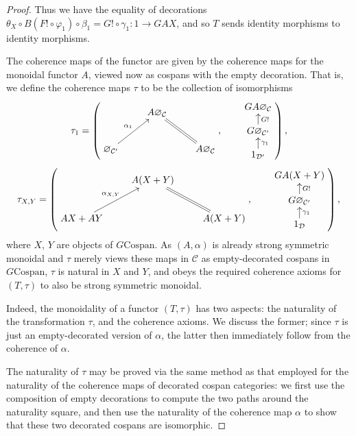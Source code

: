 \begin{proof}
Thus
we have the equality of decorations $\theta_X \circ B(F! \circ \varphi_1) \circ
\beta_1
= G! \circ \gamma_1\colon  1 \to GAX$, and so $T$ sends identity morphisms to
identity morphisms.

  The coherence maps of the functor are given by the coherence maps for the
  monoidal functor $A$, viewed now as cospans with the empty decoration. That
  is, we define the coherence maps $\tau$ to be the collection of isomorphisms
  \[
    \tau_1 = 
    \left(
    \begin{aligned}
      \xymatrix{
	& A\varnothing_{\mathcal C} \\  
	\varnothing_{\mathcal C'} \ar[ur]^{\alpha_1} && A\varnothing_{\mathcal
	C} \ar@{=}[ul]
      }
    \end{aligned}
    ,
    \qquad
    \begin{aligned}
      \xymatrixrowsep{.9pc}
      \xymatrix{
	GA\varnothing_{\mathcal C} \\
	G\varnothing_{\mathcal C'} \ar[u]_{G!} \\
	1_{\mathcal D'} \ar[u]_{\gamma_1}
      }
    \end{aligned}
    \right),
  \]
  \[
    \tau_{X,Y}=
    \left(
    \begin{aligned}
      \xymatrix{
	& A(X+Y) \\  
	AX+AY \ar[ur]^{\alpha_{X,Y}} && A(X+Y) \ar@{=}[ul]
      }
    \end{aligned}
    ,
    \qquad
    \begin{aligned}
      \xymatrixrowsep{.9pc}
      \xymatrix{
	GA(X+Y) \\
	G\varnothing_{\mathcal C'} \ar[u]_{G!} \\
	1_{\mathcal D} \ar[u]_{\gamma_1}
      }
    \end{aligned}
    \right),
  \]
  where $X$, $Y$ are objects of $G\mathrm{Cospan}$. As $(A,\alpha)$ is already
  strong symmetric monoidal and $\tau$ merely views these maps in $\mathcal C$
  as empty-decorated cospans in $G\mathrm{Cospan}$, $\tau$ is natural in $X$ and
  $Y$, and obeys the required coherence axioms for $(T,\tau)$ to also be strong
  symmetric monoidal. 

  Indeed, the monoidality of a functor $(T,\tau)$ has two aspects: the naturality
of the transformation $\tau$, and the coherence axioms. We discuss the former;
since $\tau$ is just an empty-decorated version of $\alpha$, the latter then
immediately follow from the coherence of $\alpha$.

The naturality of $\tau$ may be proved via the same method as that employed for
the naturality of the coherence maps of decorated cospan categories: we first
use the composition of empty decorations to compute the two paths around the
naturality square, and then use the naturality of the coherence map $\alpha$ to
show that these two decorated cospans are isomorphic.


\end{proof}
